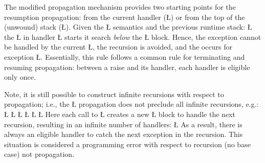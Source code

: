 \documentclass[openright,twoside]{report}
\newcommand{\BF}[1]{\Textbf{#1}}
\begin{document}
The modified propagation mechanism provides two starting points for the resumption propagation: from the current handler (\LGinlinetrue\LGbegin\lgrinde\L{}\endlgrinde\LGend{}) or from the top of the (unwound) stack (\LGinlinetrue\LGbegin\lgrinde\L{}\endlgrinde\LGend{}).
Given the \LGinlinetrue\LGbegin\lgrinde\L{}\endlgrinde\LGend{} semantics and the previous runtime stack:
\LGinlinefalse\LGbegin\lgrinde
\L{}
\endlgrinde\LGend
the \LGinlinetrue\LGbegin\lgrinde\L{}\endlgrinde\LGend{} in handler \LGinlinetrue\LGbegin\lgrinde\L{}\endlgrinde\LGend{} starts it search \emph{below} the \LGinlinetrue\LGbegin\lgrinde\L{}\endlgrinde\LGend{} block.
Hence, the exception cannot be handled by the current \LGinlinetrue\LGbegin\lgrinde\L{}\endlgrinde\LGend{}, the recursion is avoided, and the  occurs for exception \LGinlinetrue\LGbegin\lgrinde\L{}\endlgrinde\LGend{}.
Essentially, this rule follows a common rule for terminating and resuming propagation: between a raise and its handler, each handler is eligible only once.

Note, it is still possible to construct infinite recursions with respect to propagation;
i.e., the \LGinlinetrue\LGbegin\lgrinde\L{}\endlgrinde\LGend{} propagation does not preclude all infinite recursions, e.g.:
\LGinlinefalse\LGbegin\lgrinde
\L{}
\L{}
\L{\LB{}}
\L{\LB{}}
\L{\LB{}\Tab{4}{\}\0\K{\_CatchResume}(\0\V{E}\0)\0\{\0\BF{\V{rtn}();}\0\}\0\C{}\1\1\0H1}}
\CE{}\L{\LB{\}}}
\endlgrinde\LGend
Here each call to \LGinlinetrue\LGbegin\lgrinde\L{}\endlgrinde\LGend{} creates a new \LGinlinetrue\LGbegin\lgrinde\L{}\endlgrinde\LGend{} block to handle the next recursion, resulting in an infinite number of handlers:
\LGinlinefalse\LGbegin\lgrinde
\L{}
\endlgrinde\LGend
As a result, there is always an eligible handler to catch the next exception in the recursion.
This situation is considered a programming error with respect to recursion (no base case) not propagation.
\end{document}
